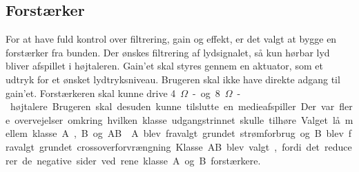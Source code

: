 \subsection{Forstærker}

For at have fuld kontrol over filtrering, gain og effekt, er det valgt at bygge en forstærker fra bunden. Der ønskes filtrering af lydsignalet, så kun hørbar lyd bliver afspillet i højtaleren. Gain’et skal styres gennem en aktuator, som et udtryk for et ønsket lydtryksniveau. Brugeren skal ikke have direkte adgang til gain’et. Forstærkeren skal kunne drive \SI{4}{$\Omega$}- og \SI{8}{$\Omega$}-højtalere.
Brugeren skal desuden kunne tilslutte en medieafspiller.

Der var flere overvejelser omkring hvilken klasse udgangstrinnet skulle tilhøre. Valget lå mellem klasse A, B og AB.\newline
A blev fravalgt grundet strømforbrug og B blev fravalgt grundet crossoverforvrængning. Klasse AB blev valgt, fordi det reducerer de negative sider ved rene klasse A og B forstærkere.
